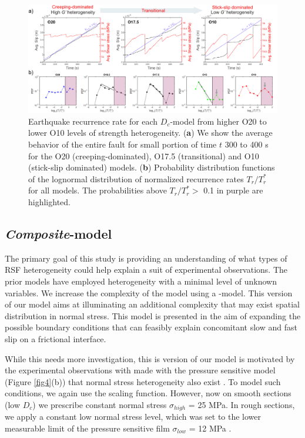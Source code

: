 \documentclass[preprint,1p, 10pt,authoryear]{elsarticle}
\begin{document}
\begin{figure}
    	\centering
	\includegraphics[scale = 0.9]{FIG11_revised.pdf} 
	\caption{Earthquake recurrence rate for each $D_{c}$-model from higher O20 to lower O10 levels of strength heterogeneity. (\textbf{a}) We show the average behavior of the entire fault for small portion of time $t$ 300 to 400 s for the O20 (creeping-dominated), O17.5 (transitional) and O10 (stick-slip dominated) models. (\textbf{b}) Probability distribution functions of the lognormal distribution of normalized recurrence rates $T_{r}/T^{*}_{r}$ for all models. The probabilities above $T_{r}/T^{*}_{r} >$ 0.1 in purple are highlighted.}
	\label{fig11}
\end{figure}
\subsection{\textit{Composite}-model}
The primary goal of this study is providing an understanding of what types of RSF heterogeneity could help explain a suit of experimental observations. The prior models have employed heterogeneity with a minimal level of unknown variables. We increase the complexity of the model using a -model.  This version of our model aims at illuminating an additional complexity that may exist spatial distribution in normal stress. This model is presented in the aim of expanding the possible boundary conditions that can feasibly explain concomitant slow and fast slip on a frictional interface. 

While this needs more investigation, this is version of our model is motivated by the experimental observations with made with the pressure sensitive model (Figure \ref{fig4}(b)) that normal stress heterogeneity also exist \citep{Selvadurai2017}. To model such conditions, we again use the scaling function. However, now on smooth sections (low $D_{c}$) we prescribe constant normal stress $\sigma_{high}$ = 25 MPa.  In rough sections, we apply a constant low normal stress level, which was set to the lower measurable limit of the pressure sensitive film $\sigma_{low}$ = 12 MPa \citep{Selvadurai2015a}. 
\end{document}
